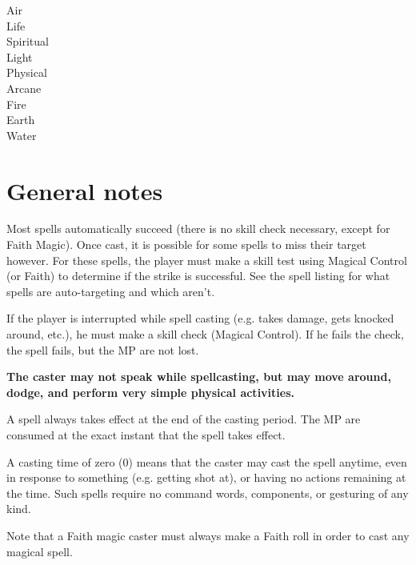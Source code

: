 \documentclass[twoside]{book}
\begin{document}
\begin{description}
    
  \item[Air] 
  \item[Life] 
  \item[Spiritual] 
  \item[Light] 
  \item[Physical] 
  \item[Arcane] 
  \item[Fire] 
  \item[Earth] 
  \item[Water] 
\end{description}
  
    

\section{General notes}
    
    {  
    Most spells automatically succeed (there is no skill check necessary, except for Faith Magic). Once cast, it is possible for some spells to miss their target however. For these spells, the player must make a skill test using Magical Control (or Faith) to determine if the strike is successful. See the spell listing for what spells are auto-targeting and which aren't.
    }
  
    {  
    If the player is interrupted while spell casting (e.g. takes damage, gets knocked around, etc.), he must make a skill check (Magical Control). If he fails the check, the spell fails, but the MP are not lost.

 \textbf{The caster may not speak while spellcasting, but may move around, dodge, and perform very simple physical activities.}


    }
  
    {  
    A spell always takes effect at the end of the casting period. The MP are consumed at the exact instant that the spell takes effect.
    }
  
    {  
    A casting time of zero (0) means that the caster may cast the spell anytime, even in response to something (e.g. getting shot at), or having no actions remaining at the time. Such spells require no command words, components, or gesturing of any kind.
    }
  
    {  
    Note that a Faith magic caster must always make a Faith roll in order to cast any magical spell.
    }
  
    
\end{document}
